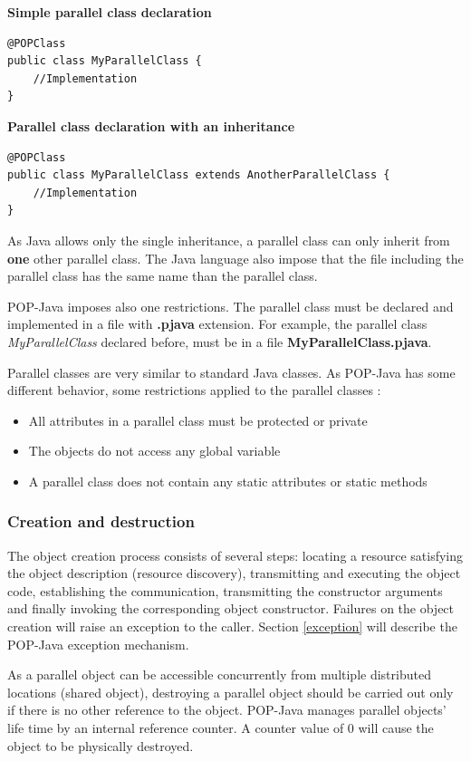 \textbf{Simple parallel class declaration}
\begin{lstlisting}
@POPClass
public class MyParallelClass {
	//Implementation
}
\end{lstlisting}\s

\textbf{Parallel class declaration with an inheritance}
\begin{lstlisting}
@POPClass
public class MyParallelClass extends AnotherParallelClass {
	//Implementation
}
\end{lstlisting}\s

As Java allows only the single inheritance, a parallel class can only inherit from \textbf{one} other parallel class.
The Java language also impose that the file including the parallel class has the same name than the parallel class.\s

POP-Java imposes also one restrictions. The parallel class must be declared and implemented in a file with \textbf{.pjava} extension.
For example, the parallel class \textit{MyParallelClass} declared before, must be in a file \textbf{MyParallelClass.pjava}.\s

Parallel classes are very similar to standard Java classes. As POP-Java has some different behavior, some restrictions applied to the parallel classes : 
\begin{itemize}
\item All attributes in a parallel class must be protected or private
\item The objects do not access any global variable
\item A parallel class does not contain any static attributes or static methods
\end{itemize}


\subsubsection{Creation and destruction}
The object creation process consists of several steps: locating a resource satisfying the object description (resource discovery), transmitting and executing the object code, establishing the communication, transmitting the constructor arguments and finally invoking the corresponding object constructor. Failures on the object creation will raise an exception to the caller. Section \ref{exception} will describe the POP-Java exception mechanism.\s

As a parallel object can be accessible concurrently from multiple distributed locations (shared object), destroying a parallel object should be carried out only if there is no other reference to the object. POP-Java manages parallel objects' life time by an internal reference counter. A counter value of 0 will cause the object to be physically destroyed. \s

